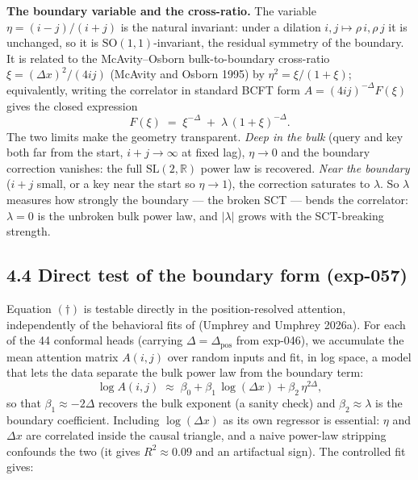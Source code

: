 \textbf{The boundary variable and the cross-ratio.} The variable
\(\eta =
(i-j)/(i+j)\) is the natural invariant: under a dilation \(i,j \mapsto
\rho\,i, \rho\,j\) it is unchanged, so it is
\(\mathrm{SO}(1,1)\)-invariant, the residual symmetry of the boundary.
It is related to the McAvity--Osborn bulk-to-boundary cross-ratio
\(\xi = (\Delta x)^2/(4ij)\) (McAvity and Osborn 1995) by
\(\eta^2 = \xi/(1+\xi)\); equivalently, writing the correlator in
standard BCFT form \(A = (4ij)^{-\Delta} F(\xi)\) gives the closed
expression \[
F(\xi) \;=\; \xi^{-\Delta} \;+\; \lambda\,(1+\xi)^{-\Delta}.
\] The two limits make the geometry transparent. \emph{Deep in the bulk}
(query and key both far from the start, \(i+j \to \infty\) at fixed
lag), \(\eta \to
0\) and the boundary correction vanishes: the full
\(\mathrm{SL}(2,\mathbb{R})\) power law is recovered. \emph{Near the
boundary} (\(i+j\) small, or a key near the start so \(\eta \to 1\)),
the correction saturates to \(\lambda\). So \(\lambda\) measures how
strongly the boundary --- the broken SCT --- bends the correlator:
\(\lambda = 0\) is the unbroken bulk power law, and \(|\lambda|\) grows
with the SCT-breaking strength.

\subsection{4.4 Direct test of the boundary form
(exp-057)}\label{direct-test-of-the-boundary-form-exp-057}

Equation \((\dagger)\) is testable directly in the position-resolved
attention, independently of the behavioral fits of (Umphrey and Umphrey
2026a). For each of the 44 conformal heads (carrying
\(\Delta = \Delta_{\text{pos}}\) from exp-046), we accumulate the mean
attention matrix \(A(i,j)\) over random inputs and fit, in log space, a
model that lets the data separate the bulk power law from the boundary
term: \[
\log A(i,j) \;\approx\; \beta_0 + \beta_1\,\log(\Delta x)
                         + \beta_2\,\eta^{2\Delta},
\] so that \(\beta_1 \approx -2\Delta\) recovers the bulk exponent (a
sanity check) and \(\beta_2 \approx \lambda\) is the boundary
coefficient. Including \(\log(\Delta x)\) as its own regressor is
essential: \(\eta\) and \(\Delta x\) are correlated inside the causal
triangle, and a naive power-law stripping confounds the two (it gives
\(R^2 \approx 0.09\) and an artifactual sign). The controlled fit gives:

